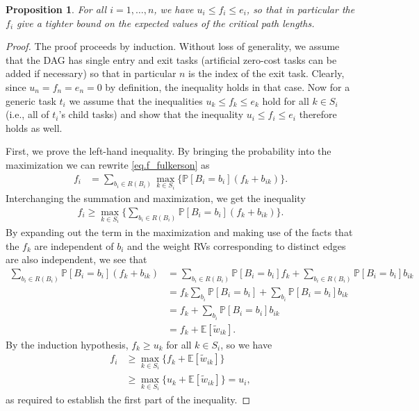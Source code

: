 \documentclass[12pt]{article}
\def\P{\mathbb{P}}
\def\E{\mathbb{E}}
\newtheorem{prop}[theorem]{Proposition}
\begin{document}
\begin{prop}
	\label{prop.fulkerson}
	For all $i = 1, \dots, n$, we have $u_i \leq f_i \leq e_i$, so that in particular the $f_i$ give a tighter bound on the expected values of the critical path lengths.
\end{prop}
\begin{proof}
	The proof proceeds by induction. Without loss of generality, we assume that the DAG has single entry and exit tasks (artificial zero-cost tasks can be added if necessary) so that in particular $n$ is the index of the exit task. Clearly, since $u_n = f_n = e_n = 0$ by definition, the inequality holds in that case. Now for a generic task $t_i$ we assume that the inequalities $u_k \leq f_k \leq e_k$ hold for all $k \in S_i$ (i.e., all of $t_i$'s child tasks) and show that the inequality $u_i \leq f_i \leq e_i$ therefore holds as well. 
	
First, we prove the left-hand inequality. By bringing the probability into the maximization we can rewrite \eqref{eq.f_fulkerson} as    
\begin{align*}
f_i &= \sum_{b_i \in R(B_i)} \max_{k \in S_i} \{ \P[B_i = b_i] (f_k + b_{ik} ) \}.
\end{align*}
Interchanging the summation and maximization, we get the inequality
\begin{align*}
f_i \geq \max_{k \in S_i} \bigg\{ \sum_{b_i \in R(B_i)} \P[B_i = b_i] (f_k + b_{ik} ) \bigg\}.
\end{align*}
By expanding out the term in the maximization and making use of the facts that the $f_k$ are independent of $b_i$ and the weight RVs corresponding to distinct edges are also independent, we see that
\begin{align*}
\sum_{b_i \in R(B_i)} \P[B_i = b_i] (f_k + b_{ik} ) &=  \sum_{b_i \in R(B_i)} \P[B_i = b_i]f_k + \sum_{b_i \in R(B_i)} \P[B_i = b_i] b_{ik} \\
&= f_k \sum_{b_i} \P[B_i = b_i] + \sum_{b_i} \P[B_i = b_i] b_{ik} \\
&= f_k + \sum_{b_i} \P[B_i = b_i] b_{ik} \\
&= f_k + \E[\tilde{w}_{ik}].
\end{align*}
By the induction hypothesis, $f_k \geq u_k$ for all $k \in S_i$, so we have
\begin{align*}
f_i &\geq \max_{k \in S_i} \{ f_k + \E[\tilde{w}_{ik}] \} \\
&\geq \max_{k \in S_i} \{ u_k + \E[\tilde{w}_{ik}] \} = u_i,
\end{align*}
as required to establish the first part of the inequality. 


\end{proof}
\end{document}
